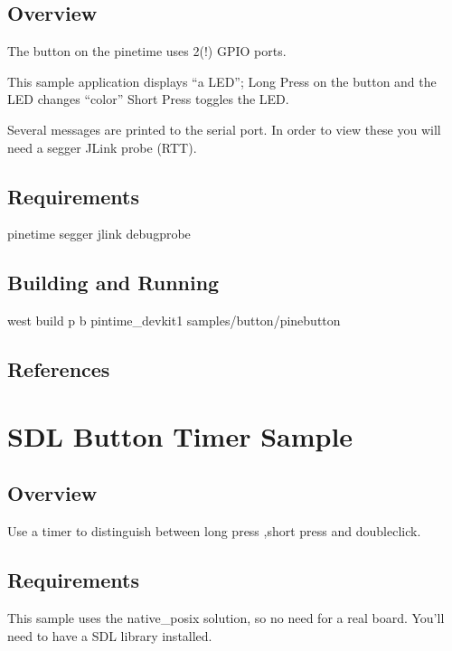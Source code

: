 \documentclass[letterpaper,10pt,english]{sphinxmanual}
\begin{document}
\subsection{Overview}
\label{\detokenize{samples/samplesbuttonpinebuttonREADME:overview}}
The button on the pinetime uses 2(!) GPIO ports.

This sample application displays “a LED”;
Long Press on the button and the LED changes “color”
Short Press toggles the LED.

Several messages are printed to the serial port.
In order to view these you will need a segger JLink probe (RTT).


\subsection{Requirements}
\label{\detokenize{samples/samplesbuttonpinebuttonREADME:requirements}}
pinetime
segger jlink debugprobe


\subsection{Building and Running}
\label{\detokenize{samples/samplesbuttonpinebuttonREADME:building-and-running}}
west build \sphinxhyphen{}p \sphinxhyphen{}b pintime\_devkit1  samples/button/pinebutton


\subsection{References}
\label{\detokenize{samples/samplesbuttonpinebuttonREADME:references}}

\section{SDL Button Timer  Sample}
\label{\detokenize{samples/samplesbuttonsdlbutton2README:sdl-button-timer-sample}}\label{\detokenize{samples/samplesbuttonsdlbutton2README:sdlb-sample}}\label{\detokenize{samples/samplesbuttonsdlbutton2README::doc}}

\subsection{Overview}
\label{\detokenize{samples/samplesbuttonsdlbutton2README:overview}}
Use a timer to distinguish between long press ,short press and double\sphinxhyphen{}click.


\subsection{Requirements}
\label{\detokenize{samples/samplesbuttonsdlbutton2README:requirements}}
This sample uses the native\_posix solution, so no need for a real board.
You’ll need to have a SDL library installed.
\end{document}
